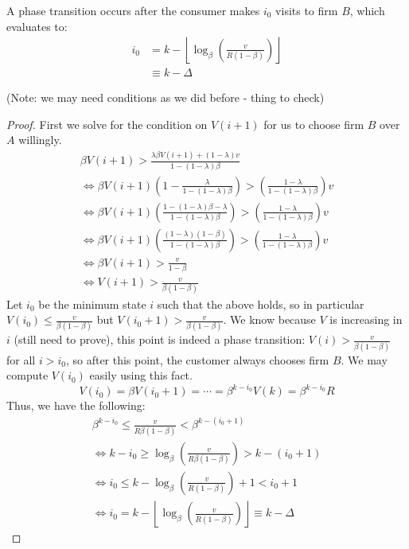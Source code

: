 \documentclass[12pt, a4paper]{article}
\begin{document}
\begin{theorem} A phase transition occurs after the consumer makes $i_0$ visits to firm $B$, which evaluates to:
\begin{align*}
i_0 &= k - \left\lfloor \log_{\beta}\left(\frac{v}{R(1-\beta)}\right)\right\rfloor \\
&\equiv k-\Delta
\end{align*}
\end{theorem}

(Note: we may need conditions as we did before - thing to check)

\begin{proof}
First we solve for the condition on $V(i+1)$ for us to choose firm $B$ over $A$ willingly.
\begin{gather*}
\beta V(i+1) > \frac{\lambda \beta V(i+1) + (1-\lambda)v}{1-(1-\lambda)\beta} \\
\iff \beta V(i+1) \left(1-\frac{\lambda}{1-(1-\lambda)\beta} \right) > \left(\frac{1-\lambda}{1-(1-\lambda)\beta} \right) v \\
\iff \beta V(i+1) \left(\frac{1-(1-\lambda)\beta -\lambda}{1-(1-\lambda)\beta} \right) > \left(\frac{1-\lambda}{1-(1-\lambda)\beta} \right) v \\
\iff \beta V(i+1) \left(\frac{(1-\lambda)(1-\beta)}{1-(1-\lambda)\beta} \right) > \left(\frac{1-\lambda}{1-(1-\lambda)\beta} \right) v \\
\iff \beta V(i+1) > \frac{v}{1-\beta} \\
\iff V(i+1) > \frac{v}{\beta(1-\beta)}
\end{gather*}
Let $i_0$ be the minimum state $i$ such that the above holds, so in particular $V(i_0) \le \frac{v}{\beta(1-\beta)}$ but $V(i_0+1) > \frac{v}{\beta(1-\beta)}$. We know because $V$ is increasing in $i$ (still need to prove), this point is indeed a phase transition: $V(i) > \frac{v}{\beta(1-\beta)}$ for all $i > i_0$, so after this point, the customer always chooses firm $B$. We may compute $V(i_0)$ easily using this fact.
\begin{equation*}
V(i_0) = \beta V(i_0+1) = \cdots = \beta^{k-i_0}V(k) = \beta^{k-i_0}R
\end{equation*}
Thus, we have the following:
\begin{gather*}
\beta^{k-i_0} \le \frac{v}{R\beta(1-\beta)} < \beta^{k-(i_0+1)} \\ 
\iff k-i_0 \ge \log_{\beta}\left(\frac{v}{R\beta(1-\beta)} \right) > k-(i_0+1) \\
\iff i_0 \le k - \log_{\beta}\left(\frac{v}{R(1-\beta)} \right) + 1 < i_0 + 1\\
\iff i_0 = k - \left\lfloor \log_{\beta}\left(\frac{v}{R(1-\beta)}\right) \right\rfloor \equiv k-\Delta
\end{gather*}
\end{proof}
\end{document}
